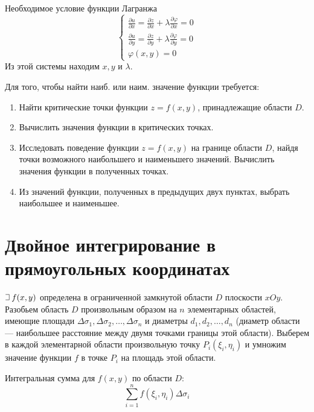 \documentclass[a4paper,12pt,oneside]{extbook}
\def\lets{%
    \mathord{\setbox0=\hbox{$\exists$}%
        \hbox{\kern 0.125\wd0%
            \vbox to \ht0{%
                \hrule width 0.75\wd0%
                \vfill%
                \hrule width 0.75\wd0}%
            \vrule height \ht0%
            \kern 0.125\wd0}%
    }%
    \hspace{2pt}
}
\theoremstyle{numbered}
\theoremstyle{unnumbered}
\theoremstyle{named}
\theoremstyle{unnumbered}
\theoremstyle{named}
\theoremstyle{named}
\theoremstyle{named}
\begin{document}
Необходимое условие функции Лагранжа
\begin{equation}
    \begin{cases}
        \frac{\partial u}{\partial x} = \frac{\partial z}{\partial x} + \lambda \frac{\partial \varphi}{\partial x} = 0 \\
        \frac{\partial u}{\partial y} = \frac{\partial z}{\partial y} + \lambda \frac{\partial \varphi}{\partial y} = 0 \\
        \varphi(x, y) = 0
    \end{cases}
\end{equation}
Из этой системы находим \(x, y\) и \(\lambda\).

Для того, чтобы найти наиб. или наим. значение функции требуется:
\begin{enumerate}
    \item Найти критические точки функции \(z = f(x, y)\), принадлежащие области \(D\).
    \item Вычислить значения функции в критических точках.
    \item Исследовать поведение функции \(z = f(x, y)\) на границе области \(D\), найдя точки возможного наибольшего и наименьшего значений. Вычислить значения функции в полученных точках.
    \item Из значений функции, полученных в предыдущих двух пунктах, выбрать наибольшее и наименьшее.
\end{enumerate}


\section{Двойное интегрирование в прямоугольных координатах}%
\label{sec:Двойное интегрирование в прямоугольных координатах}

\(\lets f(x, y)\) определена в ограниченной замкнутой области \(D\) плоскости \(xOy\). Разобьем область \(D\) произвольным образом на \(n\) элементарных областей, имеющие площади \(\Delta \sigma_1, \Delta \sigma_2, \ldots, \Delta \sigma_n\) и диаметры \(d_1, d_2, \ldots, d_n\) (диаметр области — наибольшее расстояние между двумя точками границы этой области). Выберем в каждой элементарной области произвольную точку \(P_i (\xi_i, \eta_i)\) и умножим значение функции \(f\) в точке \(P_i\) на площадь этой области.

Интегральная сумма для \(f(x, y)\) по области \(D\):
\begin{equation}
    \sum_{i=1}^n f(\xi_i, \eta_i) \Delta \sigma_i
\end{equation}
\end{document}

